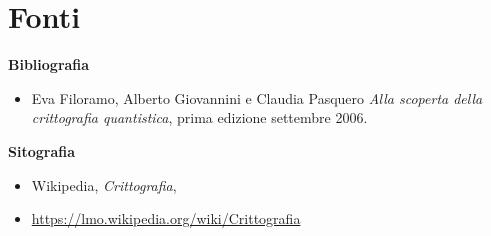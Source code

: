 \documentclass[a4paper, 12pt]{article}
\begin{document}
\clearpage

\section{Fonti}

{\large \textbf{Bibliografia}\par}
\begin{itemize}
    \item Eva Filoramo, Alberto Giovannini e Claudia Pasquero \textit{Alla scoperta della crittografia quantistica}, prima edizione settembre 2006.
\end{itemize}

{\large \textbf{Sitografia}\par}
\begin{itemize}
    \item Wikipedia, \textit{Crittografia}, 
    \item[] \href{https://lmo.wikipedia.org/wiki/Crittografia}{https://lmo.wikipedia.org/wiki/Crittografia}
\end{itemize}
\end{document}
